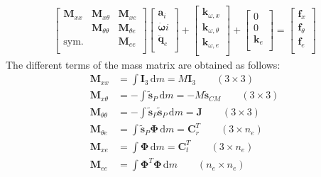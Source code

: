 \documentclass[wes, manuscript]{copernicus}
\renewcommand{\d}{\mathrm{d}}
\renewcommand{\v}[1]{\boldsymbol{#1}}
\newcommand{\m}[1]{\boldsymbol{#1}}
\newcommand{\M} {{\m{M}}}
\newcommand{\stil}  {\m{\tilde{s}}}
\renewcommand{\d}{\mathrm{d}}
\newcommand{\dm}{\d{m}}
\begin{document}
\begin{align}
    \begin{bmatrix}
       \M_{xx}    & \M_{x \theta} & \M_{ x e } \\
                   & \M_{\theta \theta}   & \M_{\theta e}   \\
       \text{sym.} &            & \M_{e e}  \\
    \end{bmatrix}
    \begin{bmatrix}
      \v{a}_i \\
      \v{\dot{\omega}}i \\
      \v{\ddot{q}}_{e} \\
    \end{bmatrix}
      +
    \begin{bmatrix}
      \v{k}_{\omega, x} \\
      \v{k}_{\omega, \theta} \\
      \v{k}_{\omega, e} \\
    \end{bmatrix}
      +
    \begin{bmatrix}
      0 \\
      0 \\
      \v{k}_{e}\\
    \end{bmatrix}
      =
    \begin{bmatrix}
      \v{f}_{x} \\
      \v{f}_{\theta} \\
      \v{f}_{e}\\
    \end{bmatrix}
    \label{eq:EOMFlexibleBodyRepeated}
\end{align}
The different terms of the mass matrix are obtained as follows:
\begin{align}
   \M_{xx}           & =  \int \m{I}_3 \,\dm = M \m{I}_3  \qquad (3\times3)
       \\
   \M_{x\theta}      & = -\int \stil_P \,\dm          = -M \m{\tilde{s}}_{CM}    \qquad (3\times3)
      \label{eq:MMxt} \\
   \M_{\theta\theta} & = -\int \stil_P \stil_P \,\dm = \v{J}   \qquad (3\times 3) 
   \\
   \M_{\theta e}     & =  \int \stil_P \m{\Phi} \,\dm=\m{C}_r^T  \qquad (3\times n_e)
   \\
   \M_{x e}          & =  \int \m{\Phi} \,\dm =\m{C}_t^T  \qquad (3 \times n_e)
      \label{eq:MMxe} \\
   \M_{e e}          & =  \int {\m{\Phi}}^T \m{\Phi} \,\dm  \qquad (n_e \times n_e)
    \label{eq:MMFlexible}
\end{align}
\end{document}
